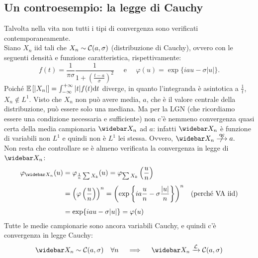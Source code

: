 \subsection{Un controesempio: la legge di Cauchy}
Talvolta nella vita non tutti i tipi di convergenza sono verificati contemporaneamente. \\
Siano $X_n$ iid tali che $X_n \sim \mathcal C(a,\sigma)$ (distribuzione di Cauchy), ovvero con le seguenti densità e funzione caratteristica, rispettivamente:
$$f(t) = \frac 1 {\pi \sigma} \frac 1 {1+(\frac{t-a}\sigma)^2} \quad \text{ e } \quad \varphi(u) = \exp\{ iau - \sigma|u| \}.$$
Poiché $\mathbb E \left[ |X_n| \right] = \int_{-\infty}^{+\infty} |t| f(t) \mathrm d t$ diverge, in quanto l'integranda è asintotica a $\frac 1 t$, $X_n \notin L^1$. Visto che $X_n$ non può avere media, $a$, che è il valore centrale della distribuzione, può essere solo una mediana. Ma per la LGN (che ricordiamo essere una condizione necessaria e sufficiente) non c'è nemmeno convergenza quasi certa della media campionaria $\widebar X_n$ ad $a$: infatti $\widebar X_n$ è funzione di variabili non $L^1$ e quindi non è $L^1$ lei stessa. Ovvero, $ \widebar X_n \centernot{\stackrel{\text{qc}}{\longrightarrow}} a.$ \\
Non resta che controllare se è almeno verificata la convergenza in legge di $\widebar X_n$:
\begin{align*}
\varphi_{\widebar X_n}(u) &= \varphi_{\frac 1 n \sum X_k}(u) = \varphi_{\sum X_k}\left(\frac u n\right) \\[4pt]
&= \left( \varphi \left(\frac u n\right) \right)^n = \left( \exp\left\{ ia \frac u n - \sigma \frac{|u|}n \right\} \right)^n & (\text{perché VA iid})\\[4pt]
&= \exp\{ iau - \sigma |u| \} = \varphi(u)
\end{align*}
Tutte le medie campionarie sono ancora variabili Cauchy, e quindi c'è convergenza in legge Cauchy:
$$ \widebar X_n \sim \Cc(a,\sigma) \quad \forall n \quad \implies \quad
\widebar X_n \xrightarrow{\Lc} \Cc(a,\sigma)$$

\cleardoublepage
